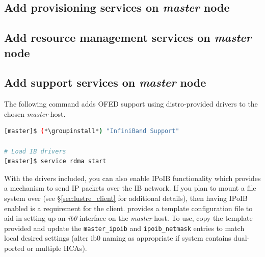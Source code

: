 \documentclass[letterpaper]{article}
\newcommand{\groupinstall}{yum -y groupinstall}
\begin{document}

\subsection{Add provisioning services on {\em master} node}



\subsection{Add resource management services on {\em master} node} \label{sec:add_rm}


\subsection{Add \InfiniBand{} support services on {\em master} node} \label{sec:add_ofed}

The following command adds OFED support using distro-provided drivers to the
chosen {\em master} host. 

\begin{lstlisting}[language=bash,keywords={}]
[master]$ (*\groupinstall*) "InfiniBand Support"

# Load IB drivers
[master]$ service rdma start
\end{lstlisting}

With the \InfiniBand{} drivers included, you can also enable IPoIB functionality
which provides a mechanism to send IP packets over the IB network. If you plan
to mount a \Lustre{} file system over \InfiniBand{} (see \S\ref{sec:lustre_client}
for additional details), then having IPoIB enabled is a requirement for the
\Lustre{} client. \FSP{} provides a template configuration file to aid in setting up
an {\em ib0} interface on the {\em master} host. To use, copy the template
provided and update the \texttt{master\_ipoib} and
\texttt{ipoib\_netmask} entries to match local desired settings (alter ib0
naming as appropriate if system contains dual-ported or multiple HCAs). 
\end{document}
